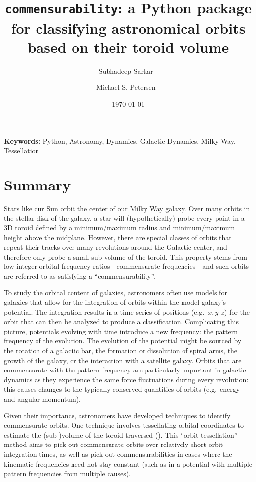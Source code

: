 \documentclass[12pt]{article}
\title{\texttt{commensurability}: a Python package for classifying astronomical
orbits based on their toroid volume}
\author[1,2%
  \ensuremath\mathparagraph]{Subhadeep Sarkar%
    \,\orcidlink{0009-0006-9454-5141}\,%
    }
\author[2%
  ]{Michael S. Petersen%
    \,\orcidlink{0000-0003-1517-3935}\,%
    }
\affil[1]{Institut de Ciències del Cosmos, Universitat de Barcelona,
Spain%
  }
\affil[2]{Institute for Astronomy, University of Edinburgh, UK%
  }
\affil[$\mathparagraph$]{Corresponding author%
}
\date{\today{}}
\begin{document}
\maketitle

\noindent \textbf{Keywords:} Python, Astronomy, Dynamics, Galactic Dynamics, Milky Way, Tessellation

\section{Summary}\label{summary}

Stars like our Sun orbit the center of our Milky Way galaxy. Over many
orbits in the stellar disk of the galaxy, a star will (hypothetically)
probe every point in a 3D toroid defined by a minimum/maximum radius and
minimum/maximum height above the midplane. However, there are special
classes of orbits that repeat their tracks over many revolutions around
the Galactic center, and therefore only probe a small sub-volume of the
toroid. This property stems from low-integer orbital frequency
ratios---commensurate frequencies---and such orbits are referred to as
satisfying a ``commensurability''.

To study the orbital content of galaxies, astronomers often use models
for galaxies that allow for the integration of orbits within the model
galaxy's potential. The integration results in a time series of
positions (e.g.~\(x,y,z\)) for the orbit that can then be analyzed to
produce a classification. Complicating this picture, potentials evolving
with time introduce a new frequency: the pattern frequency of the
evolution. The evolution of the potential might be sourced by the
rotation of a galactic bar, the formation or dissolution of spiral arms,
the growth of the galaxy, or the interaction with a satellite galaxy.
Orbits that are commensurate with the pattern frequency are particularly
important in galactic dynamics as they experience the same force
fluctuations during every revolution: this causes changes to the
typically conserved quantities of orbits (e.g.~energy and angular
momentum).

Given their importance, astronomers have developed techniques to
identify commensurate orbits. One technique involves tessellating
orbital coordinates to estimate the (sub-)volume of the toroid traversed
().
This ``orbit tessellation'' method aims to pick out commensurate orbits
over relatively short orbit integration times, as well as pick out
commensurabilities in cases where the kinematic frequencies need not
stay constant (such as in a potential with multiple pattern frequencies
from multiple causes).
\end{document}
